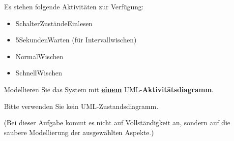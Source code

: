 Es stehen folgende Aktivitäten zur Verfügung:
\begin{itemize}
    \item SchalterZuständeEinlesen
    \item 5SekundenWarten (für Intervallwischen)
    \item NormalWischen
    \item SchnellWischen
\end{itemize}
Modellieren Sie das System mit \textbf{\underline{einem}} UML-\textbf{Aktivit\"atsdiagramm}.

Bitte verwenden Sie kein UML-Zustandsdiagramm. 

(Bei dieser Aufgabe kommt es nicht auf Vollständigkeit an, sondern auf die saubere Modellierung der ausgewählten
Aspekte.)
